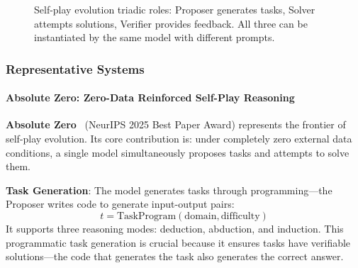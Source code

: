 \begin{figure}[htbp]
\centering
{}
\caption{Self-play evolution triadic roles: Proposer generates tasks, Solver attempts solutions, Verifier provides feedback. All three can be instantiated by the same model with different prompts.}
\label{fig:ch3-selfplay}
\end{figure}

\subsubsection{Representative Systems}

\paragraph{Absolute Zero: Zero-Data Reinforced Self-Play Reasoning}

\textbf{Absolute Zero}~\citep{absolutezero2025} (NeurIPS 2025 Best Paper Award) represents the frontier of self-play evolution. Its core contribution is: under completely zero external data conditions, a single model simultaneously proposes tasks and attempts to solve them.

\textbf{Task Generation}: The model generates tasks through programming---the Proposer writes code to generate input-output pairs:
\begin{equation}
t = \text{TaskProgram}(\text{domain}, \text{difficulty})
\label{eq:az-task}
\end{equation}
It supports three reasoning modes: deduction, abduction, and induction. This programmatic task generation is crucial because it ensures tasks have verifiable solutions---the code that generates the task also generates the correct answer.


